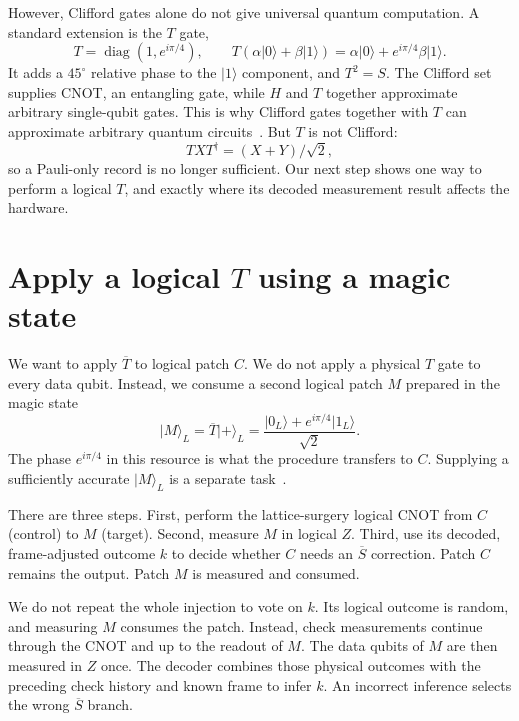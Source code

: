 \documentclass[11pt,a4paper]{article}
\newcommand{\ket}[1]{\lvert #1\rangle}
\begin{document}
However, Clifford gates alone do not give universal quantum computation. A standard extension is the $T$ gate,
\[
T=\operatorname{diag}(1,e^{i\pi/4}),\qquad
T(\alpha\ket0+\beta\ket1)=\alpha\ket0+e^{i\pi/4}\beta\ket1.
\]
It adds a $45^\circ$ relative phase to the $\ket1$ component, and $T^2=S$. The Clifford set supplies CNOT, an entangling gate, while $H$ and $T$ together approximate arbitrary single-qubit gates. This is why Clifford gates together with $T$ can approximate arbitrary quantum circuits~\cite{gottesman,fowler}. But $T$ is not Clifford:
\[
TXT^\dagger=(X+Y)/\sqrt2,
\]
so a Pauli-only record is no longer sufficient. Our next step shows one way to perform a logical $T$, and exactly where its decoded measurement result affects the hardware.

\section{Apply a logical \texorpdfstring{$T$}{T} using a magic state}
\label{sec:magic}

We want to apply $\overline T$ to logical patch $C$. We do not apply
a physical $T$ gate to every data qubit. Instead, we consume a second
logical patch $M$ prepared in the magic state
\[
\ket M_L=\overline T\ket+_L
=\frac{\ket{0_L}+e^{i\pi/4}\ket{1_L}}{\sqrt2}.
\]
The phase $e^{i\pi/4}$ in this resource is what the procedure transfers
to $C$. Supplying a sufficiently accurate $\ket M_L$ is a separate
task~\cite{magic,fowler}.

There are three steps. First, perform the lattice-surgery logical CNOT
from $C$ (control) to $M$ (target). Second, measure $M$ in logical $Z$.
Third, use its decoded, frame-adjusted outcome $k$ to decide whether
$C$ needs an $\overline S$ correction. Patch $C$ remains the output.
Patch $M$ is measured and consumed.

We do not repeat the whole injection to vote on $k$. Its logical
outcome is random, and measuring $M$ consumes the patch. Instead,
check measurements continue through the CNOT and up to the readout
of $M$. The data qubits of $M$ are then measured in $Z$ once. The
decoder combines those physical outcomes with the preceding check
history and known frame to infer $k$. An incorrect inference selects
the wrong $\overline S$ branch.
\end{document}
